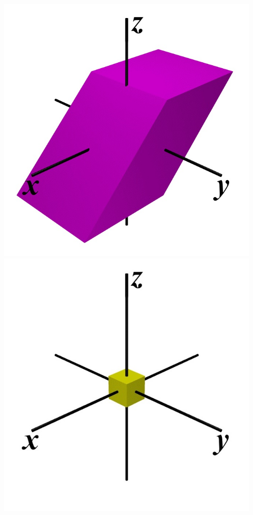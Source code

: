 \documentclass[crop=false]{standalone}
\begin{document}
\vspace{-0.015\linewidth}
\begin{center}
  \includegraphics[width=0.5\linewidth]{thesis/appendices/import/imgs/distortion.jpeg}%
  \includegraphics[width=0.5\linewidth]{thesis/appendices/import/imgs/dilation.jpeg}
  \label{fig:rot_trans}
\end{center}
\vspace{-0.01\linewidth}
\end{document}
